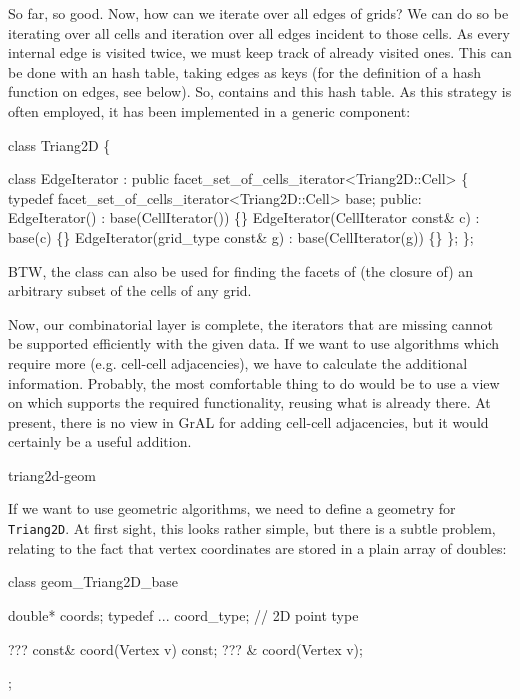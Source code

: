So far, so good. Now, how can we iterate over all
edges of  grids?
We can do so be iterating over all cells and iteration over
all edges incident to those cells.
As every internal edge is visited twice,
we must keep track of already visited ones.
This can be done with an hash table, taking edges as keys
(for the definition of  a hash function on edges, see below).
So,  contains 
 and this hash table.
As this strategy is often employed, it has been
implemented in a generic component:

\begin{example}
class Triang2D \{

   class EdgeIterator 
    : public facet_set_of_cells_iterator<Triang2D::Cell>
   \{
     typedef facet_set_of_cells_iterator<Triang2D::Cell> base;
    public: 
     EdgeIterator() : base(CellIterator()) \{\}
     EdgeIterator(CellIterator  const& c) : base(c) \{\}
     EdgeIterator(grid_type const& g)  : base(CellIterator(g)) \{\}
  \};
\};
\end{example}
BTW, the class 
can also be used for finding the facets of (the closure of)
an arbitrary subset of the cells of any grid.


Now, our combinatorial layer is complete, 
the iterators that are missing cannot be supported efficiently
with the given data.
If we want to use algorithms which require more (e.g. cell-cell 
adjacencies), we have to calculate the additional information.
Probably, the most comfortable thing to do would be
to use a view on  which supports the 
required functionality, reusing what is already there.
At present, there is no view in GrAL 
for adding cell-cell adjacencies, but it would certainly be 
a useful addition.

\begin{Label}{triang2d-geom}
\end{Label}


If we want to use geometric algorithms,
we need to define a geometry for \texttt{Triang2D}.
At first sight, this looks rather simple,
but there is a subtle problem, 
relating to the fact that vertex coordinates are stored 
in a plain array of doubles:

\begin{example}
class geom_Triang2D_base {
   double* coords;
   typedef ... coord_type;  // 2D point type

   ??? const& coord(Vertex v) const;
   ???      & coord(Vertex v);
};
\end{example}

